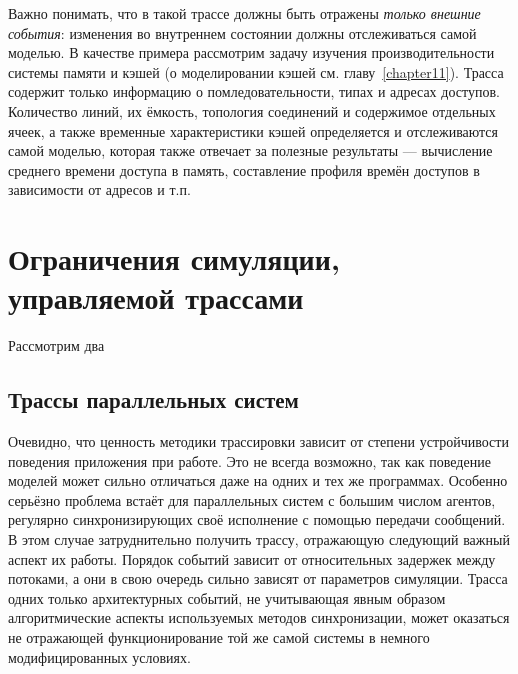 Важно понимать, что в такой трассе должны быть отражены \textit{только внешние события}: изменения во внутреннем состоянии должны отслеживаться самой моделью. В качестве примера рассмотрим задачу изучения производительности системы памяти и кэшей (о моделировании кэшей см. главу~\ref{chapter11}). Трасса содержит только информацию о помледовательности, типах и адресах доступов. Количество линий, их ёмкость, топология соединений и содержимое отдельных ячеек, а также временные характеристики кэшей определяется и отслеживаются самой моделью, которая также отвечает за полезные результаты --- вычисление среднего времени доступа в память, составление профиля времён доступов в зависимости от адресов и т.п.


\section[Ограничения трасс]{Ограничения симуляции, управляемой трассами}

Рассмотрим два \todo

\subsection{Трассы параллельных систем}


Очевидно, что ценность методики трассировки зависит от степени устройчивости поведения приложения при работе. Это не всегда возможно, так как поведение моделей может сильно отличаться даже на одних и тех же программах. Особенно серьёзно проблема встаёт для параллельных систем с большим числом агентов, регулярно синхронизирующих своё исполнение с помощью передачи сообщений. В этом случае затруднительно получить трассу, отражающую следующий важный аспект их работы.  Порядок событий зависит от относительных задержек между потоками, а они в свою очередь сильно зависят от параметров симуляции. Трасса одних только архитектурных событий, не учитывающая явным образом алгоритмические аспекты используемых методов синхронизации, может оказаться не отражающей  функционирование той же самой системы в немного модифицированных условиях.

